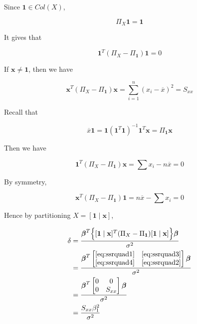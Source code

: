 \documentclass[]{book}
\theoremstyle{definition}
\theoremstyle{definition}
\theoremstyle{definition}
\theoremstyle{remark}
\begin{document}
Since \(\mathbf{1} \in Col(X)\),

\[\Pi_X \mathbf{1} = \mathbf{1}\]

It gives that

\begin{equation} \label{eq:ssrquad1}
  \mathbf{1}^T(\Pi_X - \Pi_{\mathbf{1}})\mathbf{1} = 0
\end{equation}

If \(\mathbf{x} \neq \mathbf{1}\), then we have

\begin{equation} \label{eq:ssrquad2}
  \mathbf{x}^T(\Pi_X - \Pi_{\mathbf{1}})\mathbf{x} = \sum_{i = 1}^n (x_i - \overline{x})^2 = S_{xx}
\end{equation}

Recall that

\[\overline{x}\mathbf{1} = \mathbf{1}(\mathbf{1}^T\mathbf{1})^{-1}\mathbf{1}^T\mathbf{x} = \Pi_{\mathbf{1}}\mathbf{x}\]

Then we have

\begin{equation} \label{eq:ssrquad3}
  \mathbf{1}^T(\Pi_X - \Pi_{\mathbf{1}})\mathbf{x} = \sum x_i - n \overline{x} = 0
\end{equation}

By symmetry,

\begin{equation} \label{eq:ssrquad4}
  \mathbf{x}^T(\Pi_X - \Pi_{\mathbf{1}})\mathbf{1} = n \overline{x} - \sum x_i = 0
\end{equation}

Hence by partitioning \(X = [\mathbf{1} \mid \mathbf{x}]\),

\begin{equation} \label{eq:delta2}
  \begin{split}
    \delta & = \frac{\boldsymbol\beta^T \Big\{ [\mathbf{1} \mid \mathbf{x}]^T(\Pi_X - \Pi_{\mathbf{1}})[\mathbf{1} \mid \mathbf{x}] \Big\} \boldsymbol\beta }{\sigma^2} \\
    & = \frac{\boldsymbol\beta^T \begin{bmatrix} \eqref{eq:ssrquad1} & \eqref{eq:ssrquad3} \\ \eqref{eq:ssrquad4} & \eqref{eq:ssrquad2} \end{bmatrix} \boldsymbol\beta}{\sigma^2} \\
    & = \frac{\boldsymbol\beta^T \begin{bmatrix} 0 & 0 \\ 0 & S_{xx} \end{bmatrix} \boldsymbol\beta}{\sigma^2} \\
    & = \frac{S_{xx}\beta_1^2}{\sigma^2}
  \end{split}
\end{equation}
\end{document}
